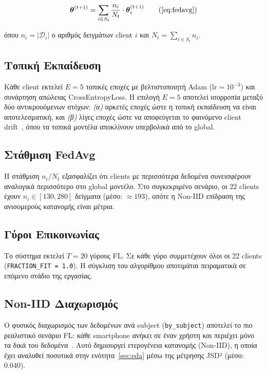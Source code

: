 \begin{equation}
\boldsymbol{\theta}^{(t+1)} = \sum_{i \in S_t} \frac{n_i}{N_t} \cdot \boldsymbol{\theta}_i^{(t+1)}
\tag{\ref{eq:fedavg}}
\end{equation}

όπου $n_i = |\mathcal{D}_i|$ ο αριθμός δειγμάτων client $i$ και $N_t = \sum_{i \in S_t} n_i$.

\subsection{Τοπική Εκπαίδευση}

Κάθε client εκτελεί $E = 5$ τοπικές εποχές με βελτιστοποιητή Adam ($\text{lr} = 10^{-3}$) και συνάρτηση απώλειας CrossEntropyLoss. Η επιλογή $E = 5$ αποτελεί ισορροπία μεταξύ δύο αντικρουόμενων στόχων: \textit{(α)} αρκετές εποχές ώστε η τοπική εκπαίδευση να είναι αποτελεσματική, και \textit{(β)} λίγες εποχές ώστε να αποφεύγεται το φαινόμενο client drift~\cite{Li2020}, όπου τα τοπικά μοντέλα αποκλίνουν υπερβολικά από το global.

\subsection{Στάθμιση FedAvg}

Η στάθμιση $n_i / N_t$ εξασφαλίζει ότι clients με περισσότερα δεδομένα συνεισφέρουν αναλογικά περισσότερο στο global μοντέλο. Στο συγκεκριμένο σενάριο, οι 22 clients έχουν $n_i \in [130, 280]$ δείγματα (μέσο: $\approx 193$), οπότε η Non-IID επίδραση της ανισομερούς κατανομής είναι μέτρια.

\subsection{Γύροι Επικοινωνίας}

Το σύστημα εκτελεί $T = 20$ γύρους FL. Σε κάθε γύρο συμμετέχουν όλοι οι 22 clients (\texttt{FRACTION\_FIT = 1.0}). Η σύγκλιση του αλγορίθμου αποτιμάται πειραματικά σε επόμενο στάδιο της εργασίας.

\subsection{Non-IID Διαχωρισμός}

Ο φυσικός διαχωρισμός των δεδομένων ανά subject (\texttt{by\_subject}) αποτελεί το πιο ρεαλιστικό σενάριο FL: κάθε smartphone ανήκει σε έναν χρήστη και περιέχει μόνο τα δικά του δεδομένα~\cite{Yang2019}. Αυτό δημιουργεί ετερογένεια κατανομής (Non-IID), η οποία έχει αναλυθεί ποσοτικά στην ενότητα~\ref{sec:eda} μέσω της μέτρησης JSD² (μέσο: 0.040).
